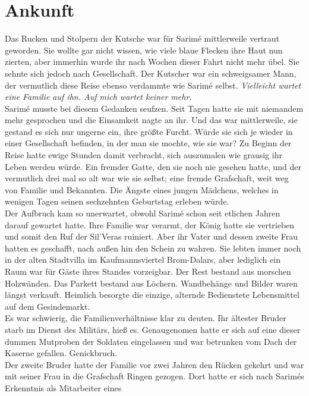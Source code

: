 \chapter{Ankunft}

Das Rucken und Stolpern der Kutsche war für Sarimé mittlerweile vertraut geworden. Sie wollte gar 
nicht wissen, wie viele blaue Flecken ihre Haut nun zierten, aber immerhin wurde ihr nach Wochen 
dieser Fahrt nicht mehr übel. Sie sehnte sich jedoch nach Gesellschaft. Der Kutscher war ein 
schweigsamer Mann, der vermutlich diese Reise ebenso verdammte wie Sarimé selbst.
\textit{Vielleicht wartet eine Familie auf ihn. Auf mich wartet keiner mehr.}\\
Sarimé musste bei diesem Gedanken seufzen. Seit Tagen hatte sie mit niemandem mehr gesprochen und 
die Einsamkeit nagte an ihr. Und das war mittlerweile, sie gestand es sich nur ungerne ein, ihre 
größte Furcht. Würde sie sich je wieder in einer Gesellschaft befinden, in der man sie mochte, wie 
sie war? Zu Beginn der Reise hatte ewige Stunden damit verbracht, sich auszumalen wie grausig ihr 
Leben werden würde. Ein fremder Gatte, den sie noch nie gesehen hatte, und der vermutlich drei mal 
so alt war wie sie selbst; eine fremde Grafschaft, weit weg von Familie und Bekannten. Die Ängste 
eines jungen Mädchens, welches in wenigen Tagen seinen sechzehnten Geburtstag erleben würde.\\
Der Aufbruch kam so unerwartet, obwohl Sarimé schon seit etlichen Jahren darauf gewartet hatte. Ihre 
Familie war verarmt, der König hatte sie vertrieben und somit den Ruf der Sil'Veras ruiniert. Aber 
ihr Vater und dessen zweite Frau hatten es geschafft, nach außen hin den Schein zu wahren. Sie 
lebten immer noch in der alten Stadtvilla im Kaufmannsviertel Brom-Dalars, aber lediglich ein Raum 
war für Gäste ihres Standes vorzeigbar. Der Rest bestand aus morschen Holzwänden. Das Parkett 
bestand aus Löchern. Wandbehänge und Bilder waren längst verkauft. Heimlich besorgte die einzige, 
alternde Bedienstete Lebensmittel auf dem Gesindemarkt.\\
Es war schwierig, die Familienverhältnisse klar zu deuten. Ihr ältester Bruder starb im Dienst des 
Militärs, hieß es. Genaugenomen hatte er sich auf eine dieser dummen Mutproben der Soldaten 
eingelassen und war betrunken vom Dach der Kaserne gefallen. Genickbruch. \\
Der zweite Bruder hatte der Familie vor zwei Jahren den Rücken gekehrt und war mit seiner Frau in 
die Grafschaft Ringen gezogen. Dort hatte er sich nach Sarimés Erkenntnis als Mitarbeiter eines 
